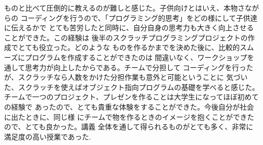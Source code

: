 \documentclass[dvipdfmx,autodetect-engine,titlepage]{jsarticle}
\begin{document}
ものと比べて圧倒的に教えるのが難しと感じた。子供向けとはいえ、本物さながらの
コーディングを行うので、「プログラミング的思考」をどの様にして子供達に伝えるかで
とても苦労したと同時に、自分自身の思考力も大きく向上させることができた。この経験は
後半のスクラッチプログラミングプロジェクトの作成でとても役立った。どのような
ものを作るかまでを決めた後に、比較的スムーズにプログラムを作成することができたのは
間違いなく、ワークショップを通して思考力が向上したからである。チームで分担して
コーディングを行ったが、スクラッチなら人数をかけた分担作業も意外と可能ということに
気づいた、スクラッチを使えばオブジェクト指向プログラムの基礎を学べると感じた。
チームで一つのプロジェクト、プレゼンを作ることは大学生になってほぼ初めての経験で
あったので、とても貴重な体験をすることができた。今後自分が社会に出たときに、同じ様
にチームで物を作るときのイメージを抱くことができたので、とても良かった。講義
全体を通して得られるものがとても多く、非常に満足度の高い授業であった.
\end{document}
